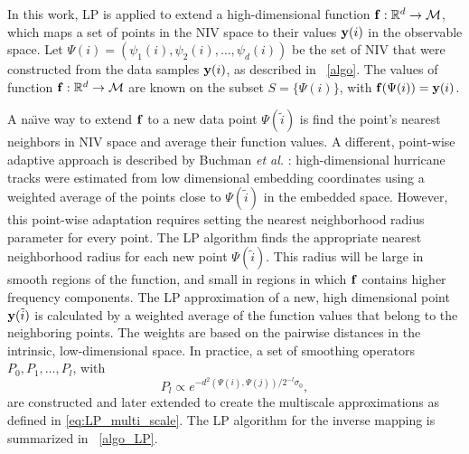 In this work, LP is applied to extend a high-dimensional function $\mathbf{f}:\mathbb{R}^d \rightarrow \mathcal{M}$,
which maps a set of points in the NIV space to their values $\mathbf{y}(i)$ in the observable space.
%
Let $\Psi(i) = \left(\psi_1(i),\psi_2(i),\ldots,\psi_d(i)\right)$ be the set of NIV that were constructed from the data samples $\mathbf{y}(i)$, as described in \tab~\ref{algo}.
%
The values of function $\mathbf{f}:\mathbb{R}^d \rightarrow \mathcal{M}$ are known on the subset $S = \{\Psi(i)\}$, with $\mathbf{f}(\Psi(i)) = \mathbf{y}(i)$.

A na\"{\i}ve way to extend $\mathbf{f}$ to a new data point $\Psi(\tilde{i})$ is find the point's nearest neighbors in NIV space and average their function values.
%
A different, point-wise adaptive approach is described by Buchman {\em et al.} \cite{buchman2011high}:
high-dimensional hurricane tracks were estimated from low dimensional embedding coordinates using a weighted average of the points close to $\Psi(\tilde{i})$ in the embedded space.
%
However, this point-wise adaptation requires setting the nearest neighborhood radius parameter for every point.
%
The LP algorithm finds the appropriate nearest neighborhood radius for each new point $\Psi(\tilde{i})$.
%
This radius will be large in smooth regions of the function, and small in regions in which $\mathbf{f}$ contains higher frequency components.
%
The LP approximation of a new, high dimensional point $\mathbf{y}(\tilde{i})$ is calculated by a weighted average of the function values that belong to the neighboring points.
%
The weights are based on the pairwise distances in the intrinsic, low-dimensional space.
%
In practice, a set of smoothing operators $P_0, P_1, \ldots, P_l$, with
\begin{equation} \label{eq:LP_multi_scale_app}
P_l \propto e^{-d^2(\Psi(i),\Psi(j)) / 2^{-l} \sigma_0},
\end{equation}
are constructed and later extended to create the multiscale approximations as defined in \eqref{eq:LP_multi_scale}.
%
The LP algorithm for the inverse mapping is summarized in \tab~\ref{algo_LP}.

